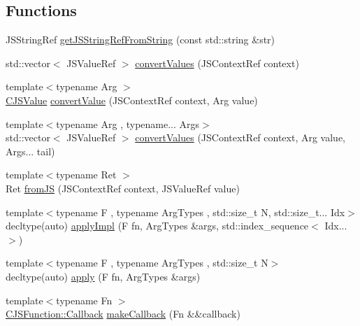 \subsection*{Functions}
\begin{DoxyCompactItemize}
\item 
J\+S\+String\+Ref \mbox{\hyperlink{namespacecpp__javascriptcore_a64c0a5a8f178db673f0eb7704ee78816}{get\+J\+S\+String\+Ref\+From\+String}} (const std\+::string \&str)
\item 
std\+::vector$<$ J\+S\+Value\+Ref $>$ \mbox{\hyperlink{namespacecpp__javascriptcore_a5d52cd145305a6c024858e80973867e5}{convert\+Values}} (J\+S\+Context\+Ref context)
\item 
{\footnotesize template$<$typename Arg $>$ }\\\mbox{\hyperlink{classcpp__javascriptcore_1_1_c_j_s_value}{C\+J\+S\+Value}} \mbox{\hyperlink{namespacecpp__javascriptcore_a2ae1cd64b14aa12f56f503463a3dede6}{convert\+Value}} (J\+S\+Context\+Ref context, Arg value)
\item 
{\footnotesize template$<$typename Arg , typename... Args$>$ }\\std\+::vector$<$ J\+S\+Value\+Ref $>$ \mbox{\hyperlink{namespacecpp__javascriptcore_ad53bb2850a23b75e56b6d953fc90b552}{convert\+Values}} (J\+S\+Context\+Ref context, Arg value, Args... tail)
\item 
{\footnotesize template$<$typename Ret $>$ }\\Ret \mbox{\hyperlink{namespacecpp__javascriptcore_a63b8017b1766288a57631889bd4d205c}{from\+JS}} (J\+S\+Context\+Ref context, J\+S\+Value\+Ref value)
\item 
{\footnotesize template$<$typename F , typename Arg\+Types , std\+::size\+\_\+t N, std\+::size\+\_\+t... Idx$>$ }\\decltype(auto) \mbox{\hyperlink{namespacecpp__javascriptcore_a2c32796cd818b3a75a7dc6f033b4a596}{apply\+Impl}} (F fn, Arg\+Types \&args, std\+::index\+\_\+sequence$<$ Idx... $>$)
\item 
{\footnotesize template$<$typename F , typename Arg\+Types , std\+::size\+\_\+t N$>$ }\\decltype(auto) \mbox{\hyperlink{namespacecpp__javascriptcore_ae99580d5a07367766396914230c5cb4a}{apply}} (F fn, Arg\+Types \&args)
\item 
{\footnotesize template$<$typename Fn $>$ }\\\mbox{\hyperlink{classcpp__javascriptcore_1_1_c_j_s_function_a3cf83c4e33bfeafbe770047bb75556f5}{C\+J\+S\+Function\+::\+Callback}} \mbox{\hyperlink{namespacecpp__javascriptcore_ac75c77a83b4f02ba3e0529799f49a313}{make\+Callback}} (Fn \&\&callback)
\end{DoxyCompactItemize}


